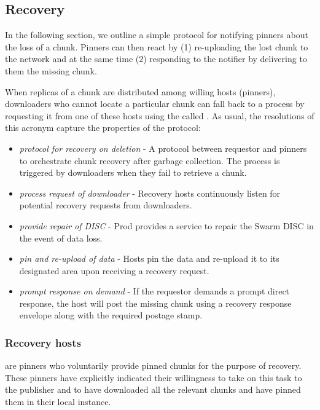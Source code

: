 \subsection{Recovery \statusyellow}\label{sec:recovery-chunks}


In the following section, we outline a simple protocol for notifying pinners about the loss of a chunk. Pinners can then react by (1) re-uploading the lost chunk to the network and at the same time (2) responding to the notifier by delivering to them the missing chunk. 

When replicas of a chunk are distributed among willing hosts (pinners), downloaders who cannot locate a particular chunk can fall back to a  process by requesting it from one of these hosts using the  called .
As usual, the resolutions of this acronym capture the properties of the protocol:

\begin{itemize}[noitemsep]
\item \emph{protocol for recovery on deletion} - A protocol between requestor and pinners to orchestrate chunk recovery after garbage collection. The process is triggered by downloaders when they fail to retrieve a chunk.
\item \emph{process request of downloader} - Recovery hosts continuously listen for potential recovery requests from downloaders.
\item \emph{provide repair of DISC} - 
Prod provides a service to repair the Swarm DISC in the event of data loss.
\item \emph{pin and re-upload of data} -     
Hosts pin the data and re-upload it to its designated area upon receiving a recovery request. 
\item \emph{prompt response on demand}  - If the requestor demands a prompt direct response, the host will post the missing chunk using a recovery response envelope along with the required postage stamp.
\end{itemize}

\subsubsection{Recovery hosts}

 are pinners who voluntarily provide pinned chunks for the purpose of recovery. These pinners have explicitly indicated their willingness to take on this task to the publisher and to have downloaded all the relevant chunks and have pinned them in their local instance. 

